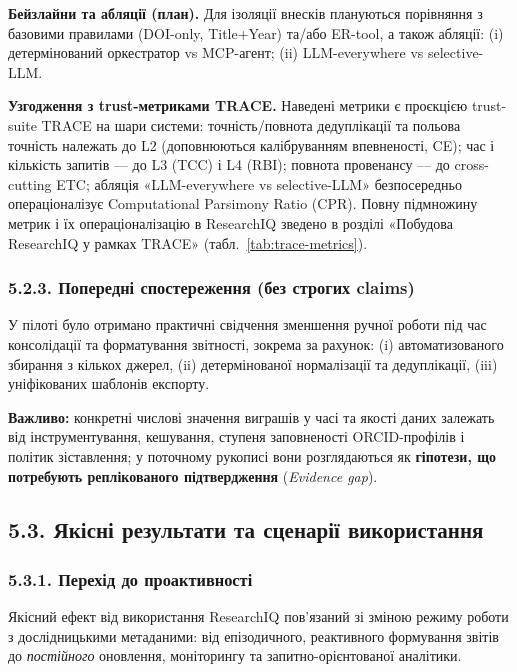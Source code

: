 \textbf{Бейзлайни та абляції (план).} Для ізоляції внесків плануються порівняння з базовими правилами (DOI-only, Title+Year) та/або ER-tool, а також абляції: (i) детермінований оркестратор vs MCP-агент; (ii) LLM-everywhere vs selective-LLM.

\iftrace
\textbf{Узгодження з trust-метриками TRACE.} Наведені метрики є проєкцією trust-suite TRACE на шари системи: точність/повнота дедуплікації та польова точність належать до L2 (доповнюються калібруванням впевненості, CE); час і кількість запитів --- до L3 (TCC) і L4 (RBI); повнота провенансу --- до cross-cutting ETC; абляція «LLM-everywhere vs selective-LLM» безпосередньо операціоналізує Computational Parsimony Ratio (CPR). Повну підмножину метрик і їх операціоналізацію в ResearchIQ зведено в розділі «Побудова ResearchIQ у рамках TRACE» (табл.~\ref{tab:trace-metrics}).
\fi

\subsubsection*{5.2.3. Попередні спостереження (без строгих claims)}

У пілоті було отримано практичні свідчення зменшення ручної роботи під час консолідації та форматування звітності, зокрема за рахунок: (i) автоматизованого збирання з кількох джерел, (ii) детермінованої нормалізації та дедуплікації, (iii) уніфікованих шаблонів експорту.

\textbf{Важливо:} конкретні числові значення виграшів у часі та якості даних залежать від інструментування, кешування, ступеня заповненості ORCID-профілів і політик зіставлення; у поточному рукописі вони розглядаються як \textbf{гіпотези, що потребують реплікованого підтвердження} (\textit{Evidence gap}).

\subsection*{5.3. Якісні результати та сценарії використання}

\subsubsection*{5.3.1. Перехід до проактивності}

Якісний ефект від використання ResearchIQ пов'язаний зі зміною режиму роботи з дослідницькими метаданими: від епізодичного, реактивного формування звітів до \textit{постійного} оновлення, моніторингу та запитно-орієнтованої аналітики.


